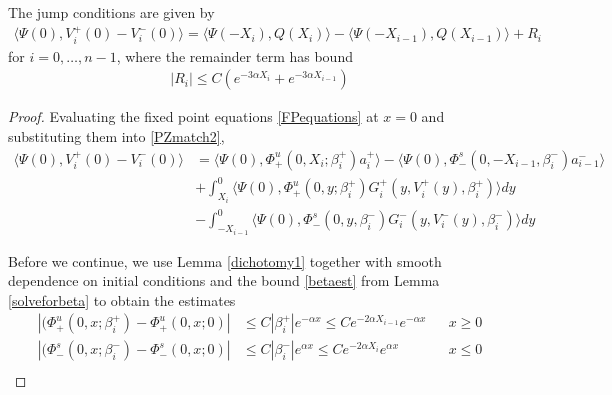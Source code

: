 \documentclass[thesis.tex]{subfiles}
\begin{document}
\begin{lemma}\label{jumplemma1}
The jump conditions are given by
\begin{align}\label{jumpcond1}
\langle \Psi(0), V_i^+(0) - V_i^-(0) \rangle = 
\langle \Psi(-X_i), Q(X_i) \rangle - \langle \Psi(-X_{i-1}), Q(X_{i-1}) \rangle + R_i
\end{align}
for $i = 0, \dots, n-1$, where the remainder term has bound
\begin{align}\label{Rbound}
|R_i| \leq C ( e^{-3 \alpha X_i} +  e^{-3 \alpha X_{i-1}})
\end{align}
\begin{proof}
Evaluating the fixed point equations \eqref{FPequations} at $x = 0$ and substituting them into \eqref{PZmatch2},
\begin{align*}
\langle \Psi(0), V_i^+(0) - V_i^-(0) \rangle &= \langle \Psi(0), \Phi^u_+(0, X_i; \beta_i^+) a_i^+ \rangle
- \langle \Psi(0), \Phi^s_-(0, -X_{i-1}, \beta_i^-) a_{i-1}^- \rangle \\
&+ \int_{X_i}^0 \langle \Psi(0), \Phi_+^u(0, y; \beta_i^+) G_i^+(y, V_i^+(y),\beta_i^+) \rangle dy \\
&- \int_{-X_{i-1}}^0 \langle \Psi(0), \Phi_-^s(0, y, \beta_i^-) G_i^-(y, V_i^-(y),\beta_i^-) \rangle dy
\end{align*}

Before we continue, we use Lemma \ref{dichotomy1} together with smooth dependence on initial conditions and the bound \eqref{betaest} from Lemma \ref{solveforbeta} to obtain the estimates
\begin{equation}\label{phibetaest}
\begin{aligned}
|(\Phi_+^u(0, x; \beta_i^+) - \Phi_+^u(0, x; 0)| &\leq C |\beta_i^+| e^{-\alpha x} \leq C e^{-2 \alpha X_{i-1}} e^{-\alpha x} && x \geq 0\\
|(\Phi_-^s(0, x; \beta_i^-) - \Phi_-^s(0, x; 0)| &\leq C |\beta_i^-| e^{\alpha x}  \leq C e^{-2 \alpha X_i}e^{\alpha x} &&  x \leq 0\\
\end{aligned}
\end{equation}


\end{proof}
\end{lemma}
\end{document}
